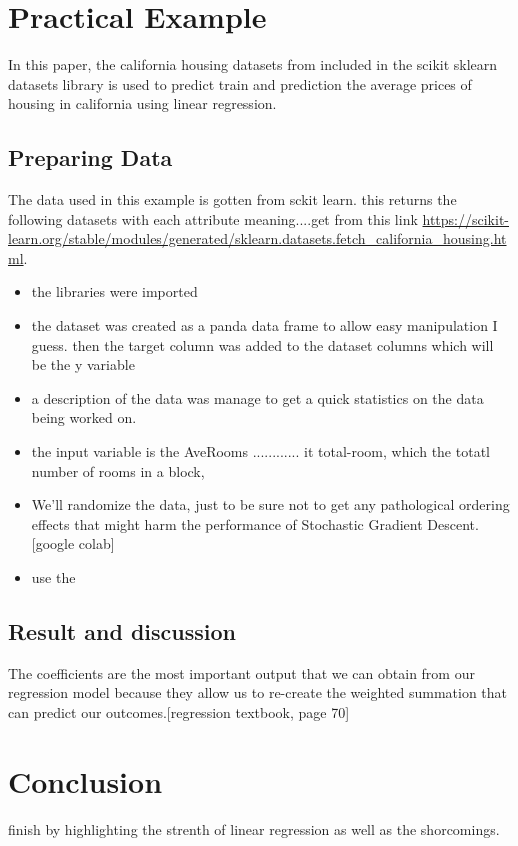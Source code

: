 \documentclass[conference]{IEEEtran}
\begin{document}
\section{Practical Example}
In this paper, the california housing datasets from \cite{KELLEYPACE1997291} included in the scikit sklearn datasets library is used to predict train and prediction the average prices of housing in california using linear regression.
\subsection{Preparing Data}
The data used in this example is gotten from sckit learn. this returns the following datasets with each attribute meaning....get from this link \url{https://scikit-learn.org/stable/modules/generated/sklearn.datasets.fetch_california_housing.html}.



\begin{itemize}
\item the libraries were imported
\item the dataset was created as a panda data frame to allow easy manipulation I guess. then the target column was added to the dataset columns which will be the y variable
\item a description of the data was manage to get a quick statistics on the data being worked on.
\item the input variable is the AveRooms ............ it total-room, which the totatl number of rooms in a block,
\item We'll randomize the data, just to be sure not to get any pathological ordering effects that might harm the performance of Stochastic Gradient Descent.[google colab]
\item use the 
\end{itemize}

\subsection{Result and discussion}
The coefficients are the most important output that we can obtain from our regression model because they allow us to re-create the weighted summation that can predict our outcomes.[regression textbook, page 70]

\section{Conclusion}
finish by highlighting the strenth of linear regression as well as the shorcomings.


\end{document}
